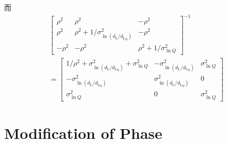 而
\begin{align}
    &\begin{bmatrix}
        \rho^2&\rho^2&-\rho^2\\
        \rho^2&\rho^2+1/\sigma_{\ln (d_\text{L}/{d_\text{L}}_0)}^2&-\rho^2\\
        -\rho^2&-\rho^2&\rho^2+1/\sigma_{\ln Q}^2
    \end{bmatrix}^{-1}\\
    &=\begin{bmatrix}
        1/\rho^2+\sigma_{\ln (d_\text{L}/{d_\text{L}}_0)}^2+\sigma_{\ln Q}^2&-\sigma_{\ln (d_\text{L}/{d_\text{L}}_0)}^2&\sigma_{\ln Q}^2\\
        -\sigma_{\ln (d_\text{L}/{d_\text{L}}_0)}^2&\sigma_{\ln (d_\text{L}/{d_\text{L}}_0)}^2&0\\
        \sigma_{\ln Q}^2&0&\sigma_{\ln Q}^2
    \end{bmatrix}
\end{align}

\section{Modification of Phase}

